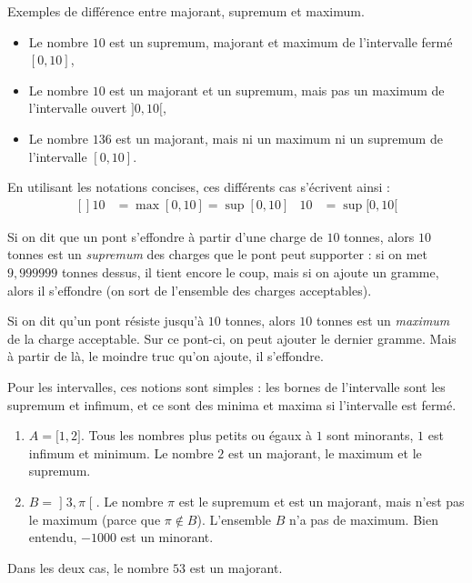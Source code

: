 \begin{example}
Exemples de différence entre majorant, supremum et maximum.
\begin{itemize}
\item Le nombre $10$ est un supremum, majorant et maximum de l'intervalle fermé $[0,10]$,
\item Le nombre $10$ est un majorant et un supremum, mais pas un maximum de l'intervalle ouvert $]0,10[$,
\item Le nombre $136$ est un majorant, mais ni un maximum ni un supremum de l'intervalle $[0,10]$.
\end{itemize}
\end{example}

En utilisant les notations concises, ces différents cas s'écrivent ainsi :
\begin{equation}
    \begin{aligned}[]
10&=\max[0,10]=\sup[0,10]	& 10&=\sup[0,10[
    \end{aligned}
\end{equation}


\begin{example}
Si on dit que un pont s'effondre à partir d'une charge de $10$ tonnes, alors $10$ tonnes est un \emph{supremum} des charges que le pont peut supporter : si on met $9,999999$ tonnes dessus, il tient encore le coup, mais si on ajoute un gramme, alors il s'effondre (on sort de l'ensemble des charges acceptables).
\end{example}

\begin{example}
Si on dit qu'un pont résiste jusqu'à $10$ tonnes, alors $10$ tonnes est un \emph{maximum} de la charge acceptable. Sur ce pont-ci, on peut ajouter le dernier gramme. Mais à partir de là, le moindre truc qu'on ajoute, il s'effondre.
\end{example}



\begin{example}
	Pour les intervalles, ces notions sont simples : les bornes de l'intervalle sont les supremum et infimum, et ce sont des minima et maxima si l'intervalle est fermé.
	\begin{enumerate}
		\item
			$A=\mathopen[ 1 , 2 \mathclose]$. Tous les nombres plus petits ou égaux à $1$ sont minorants, $1$ est infimum et minimum. Le nombre $2$ est un majorant, le maximum et le supremum.
		\item
			$B=\mathopen] 3 , \pi \mathclose[$. Le nombre $\pi$ est le supremum et est un majorant, mais n'est pas le maximum (parce que $\pi\notin B$). L'ensemble $B$ n'a pas de maximum. Bien entendu, $-1000$ est un minorant.
	\end{enumerate}
    Dans les deux cas, le nombre $53$ est un majorant.
\end{example}

